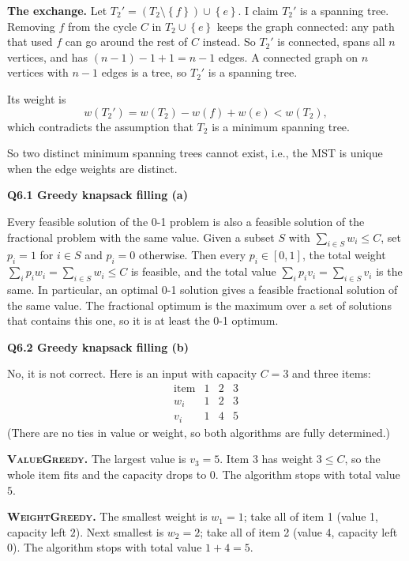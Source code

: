 \documentclass[11pt]{article}
\newcommand{\set}[1]{\left\{#1\right\}}
\newcommand{\algo}[1]{\textsc{#1}}
\newcommand{\qpage}[1]{\clearpage\noindent\textbf{\large #1}\par\medskip}
\begin{document}
\textbf{The exchange.}
Let $T_2' = (T_2 \setminus \set{f}) \cup \set{e}$.
I claim $T_2'$ is a spanning tree.
Removing $f$ from the cycle $C$ in $T_2 \cup \set{e}$ keeps the graph connected: any path that used $f$ can go around the rest of $C$ instead.
So $T_2'$ is connected, spans all $n$ vertices, and has $(n-1) - 1 + 1 = n-1$ edges.
A connected graph on $n$ vertices with $n-1$ edges is a tree, so $T_2'$ is a spanning tree.

Its weight is
\[
  w(T_2') = w(T_2) - w(f) + w(e) < w(T_2),
\]
which contradicts the assumption that $T_2$ is a minimum spanning tree.

So two distinct minimum spanning trees cannot exist, i.e., the MST is unique when the edge weights are distinct.
    

\qpage{Q6.1 Greedy knapsack filling (a)}

Every feasible solution of the 0-1 problem is also a feasible solution of the fractional problem with the same value.
Given a subset $S$ with $\sum_{i \in S} w_i \le C$, set $p_i = 1$ for $i \in S$ and $p_i = 0$ otherwise.
Then every $p_i \in [0,1]$, the total weight $\sum_i p_i w_i = \sum_{i\in S} w_i \le C$ is feasible, and the total value $\sum_i p_i v_i = \sum_{i \in S} v_i$ is the same.
In particular, an optimal 0-1 solution gives a feasible fractional solution of the same value.
The fractional optimum is the maximum over a set of solutions that contains this one, so it is at least the 0-1 optimum.
    

\qpage{Q6.2 Greedy knapsack filling (b)}

No, it is not correct.
Here is an input with capacity $C = 3$ and three items:
\[
  \begin{array}{c|ccc}
    \text{item} & 1 & 2 & 3 \\ \hline
    w_i & 1 & 2 & 3 \\
    v_i & 1 & 4 & 5
  \end{array}
\]
(There are no ties in value or weight, so both algorithms are fully determined.)

\textbf{\algo{ValueGreedy}.}
The largest value is $v_3 = 5$.
Item 3 has weight $3 \le C$, so the whole item fits and the capacity drops to $0$.
The algorithm stops with total value $5$.

\textbf{\algo{WeightGreedy}.}
The smallest weight is $w_1 = 1$; take all of item 1 (value 1, capacity left $2$).
Next smallest is $w_2 = 2$; take all of item 2 (value 4, capacity left $0$).
The algorithm stops with total value $1 + 4 = 5$.
\end{document}
